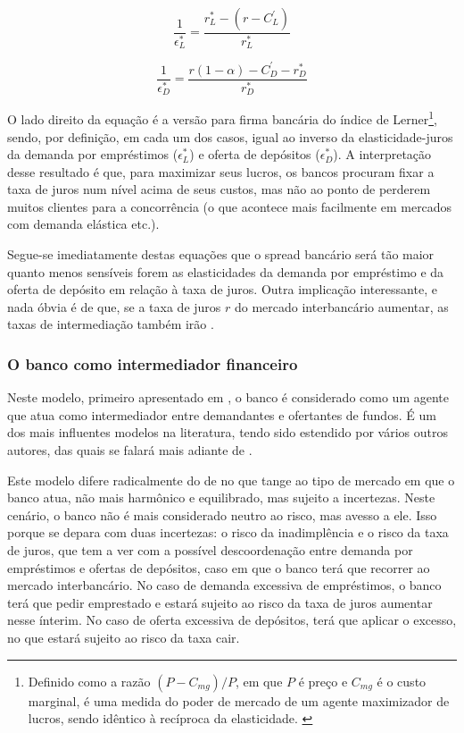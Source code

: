 \documentclass[a4paper, article, 12pt, openany, oneside, english, brazil]{abntex2}
\begin{document}
	\begin{equation}
	\frac{1}{\epsilon^{*}_L} = \frac{r^{*}_L - (r - C^{'}_L)}{r^{*}_L}
	\end{equation}

	\begin{equation}
	\frac{1}{\epsilon^{*}_D} = \frac{r(1-\alpha)-C^{'}_D - r^{*}_D}{r^{*}_D}
	\end{equation}

    O lado direito da equação é a versão para firma bancária do índice de Lerner\footnote{ Definido como a razão $(P - C_{mg}) / P$, em que $P$ é preço e $C_{mg}$ é o custo marginal, é uma medida do poder de mercado de um agente maximizador de lucros, sendo idêntico à recíproca da elasticidade. \cite{maudos}}, sendo, por definição, em cada um dos casos, igual ao inverso da elasticidade-juros da demanda por empréstimos ($\epsilon^{*}_L$) e oferta de depósitos ($\epsilon^{*}_D$). A interpretação desse resultado é que, para maximizar seus lucros, os bancos procuram fixar a taxa de juros num nível acima de seus custos, mas não ao ponto de perderem muitos clientes para a concorrência (o que acontece mais facilmente em mercados com demanda elástica etc.).

    Segue-se imediatamente destas equações que o spread bancário será tão maior quanto menos sensíveis forem as elasticidades da demanda por empréstimo e da oferta de depósito em relação à taxa de juros. Outra implicação interessante, e nada óbvia é de que, se a taxa de juros $r$ do mercado interbancário aumentar, as taxas de intermediação também irão \cite[p.~59]{freixas}.

\subsubsection{O banco como intermediador financeiro}

    Neste modelo, primeiro apresentado em , o banco é considerado como um agente que atua como intermediador entre demandantes e ofertantes de fundos. É um dos mais influentes modelos na literatura, tendo sido estendido por vários outros autores, das quais se falará mais adiante de .

    Este modelo difere radicalmente do de  no que tange ao tipo de mercado em que o banco atua, não mais harmônico e equilibrado, mas sujeito a incertezas. Neste cenário, o banco não é mais considerado neutro ao risco, mas avesso a ele. Isso porque se depara com duas incertezas: o risco da inadimplência e o risco da taxa de juros, que tem a ver com a possível descoordenação entre demanda por empréstimos e ofertas de depósitos, caso em que o banco terá que recorrer ao mercado interbancário. No caso de demanda excessiva de empréstimos, o banco terá que pedir emprestado e estará sujeito ao risco da taxa de juros aumentar nesse ínterim. No caso de oferta excessiva de depósitos, terá que aplicar o excesso, no que estará sujeito ao risco da taxa cair. 
\end{document}
